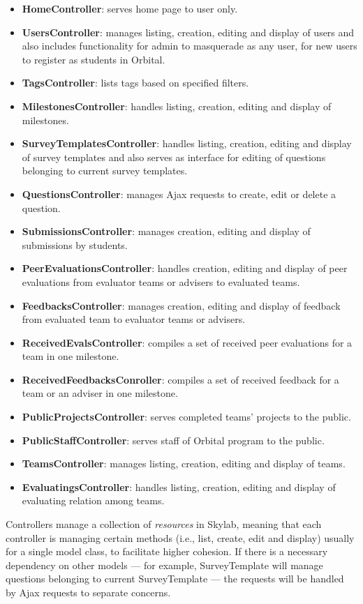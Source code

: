 \begin{itemize}
  \item \textbf{HomeController}: serves home page to user only.
  \item \textbf{UsersController}: manages listing, creation, editing and display of users and also includes functionality for admin to masquerade as any user, for new users to register as students in Orbital.
  \item \textbf{TagsController}: lists tags based on specified filters.
  \item \textbf{MilestonesController}: handles listing, creation, editing and display of milestones.
  \item \textbf{SurveyTemplatesController}: handles listing, creation, editing and display of survey templates and also serves as interface for editing of questions belonging to current survey templates. 
  \item \textbf{QuestionsController}: manages Ajax requests to create, edit or delete a question.
  \item \textbf{SubmissionsController}: manages creation, editing and display of submissions by students.
  \item \textbf{PeerEvaluationsController}: handles creation, editing and display of peer evaluations from evaluator teams or advisers to evaluated teams.
  \item \textbf{FeedbacksController}: manages creation, editing and display of feedback from evaluated team to evaluator teams or advisers.
  \item \textbf{ReceivedEvalsController}: compiles a set of received peer evaluations for a team in one milestone.
  \item \textbf{ReceivedFeedbacksConroller}: compiles a set of received feedback for a team or an adviser in one milestone.
  \item \textbf{PublicProjectsController}: serves completed teams' projects to the public.
  \item \textbf{PublicStaffController}: serves staff of Orbital program to the public.
  \item \textbf{TeamsController}: manages listing, creation, editing and display of teams.
  \item \textbf{EvaluatingsController}: handles listing, creation, editing and display of evaluating relation among teams.
\end{itemize}

Controllers manage a collection of \textit{resources} in Skylab, meaning that each controller is managing certain methods (i.e., list, create, edit and display) usually for a single model class, to facilitate higher cohesion. If there is a necessary dependency on other models --- for example, SurveyTemplate will manage questions belonging to current SurveyTemplate --- the requests will be handled by Ajax requests to separate concerns.

